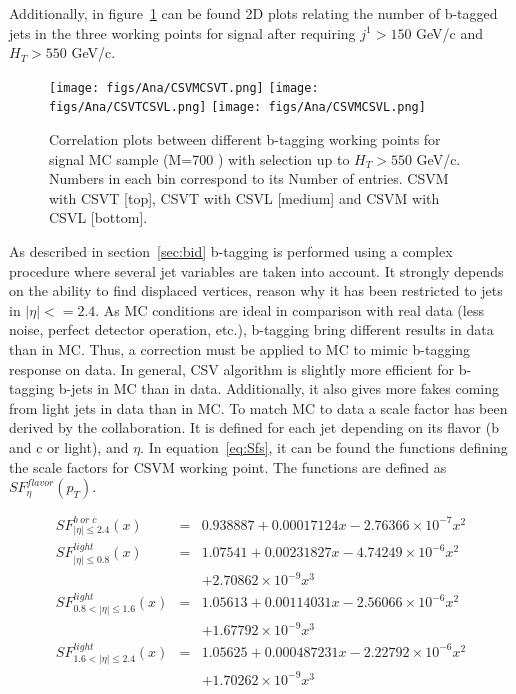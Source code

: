 Additionally, in figure~\ref{fig:WPcorr} can be found 2D plots relating the number of b-tagged jets in the three working points for signal after requiring $j^{1}>150$ GeV/c and $H_{T}>550$ GeV/c. 

\begin{figure}[!Hhtbp]
  \begin{center}
    \texttt{[image: figs/Ana/CSVMCSVT.png]}
    \texttt{[image: figs/Ana/CSVTCSVL.png]}
    \texttt{[image: figs/Ana/CSVMCSVL.png]}
    \caption{Correlation plots between different b-tagging working points for signal MC sample (M=700 \GeVcc) with selection up to $H_{T}>550$ GeV/c. Numbers in each bin correspond to its Number of entries. CSVM with CSVT [top], CSVT with CSVL [medium] and CSVM with CSVL [bottom].}
    \label{fig:WPcorr}
  \end{center}
\end{figure}

As described in section~\ref{sec:bid} b-tagging is performed using a complex procedure where several jet variables are taken into account. It strongly depends on the ability to find displaced vertices, reason why it has been restricted to jets in $|\eta|<=2.4$. As MC conditions are ideal in comparison with real data (less noise, perfect detector operation, etc.), b-tagging bring different results in data than in MC. Thus, a correction must be applied to MC to mimic b-tagging response on data. In general, CSV algorithm is slightly more efficient for b-tagging b-jets in MC than in data. Additionally, it also gives more fakes coming from light jets in data than in MC. To match MC to data a scale factor has been derived by the collaboration. It is defined for each jet depending on its flavor (b and c or light), \pt and $\eta$. In equation~\ref{eq:Sfs}, it can be found the functions defining the scale factors for CSVM working point. The functions are defined as $SF^{flavor}_{\eta}(p_{T})$.

\begin{eqnarray}
  \label{eq:Sfs}
  SF^{b\; or\; c}_{|\eta|\le 2.4}(x) & = & 0.938887 + 0.00017124x - 2.76366 \times 10^{-7}x^{2} \nonumber \\
  SF^{light}_{|\eta|\le 0.8}(x) & = & 1.07541 + 0.00231827x - 4.74249 \times 10^{-6}x^{2}  \nonumber \\
  &  & +2.70862 \times 10^{-9}x^{3} \nonumber \\
  SF^{light}_{0.8 < |\eta|\le 1.6}(x) & = & 1.05613 + 0.00114031x - 2.56066 \times 10^{-6}x^{2} \nonumber \\
  &  & + 1.67792 \times 10^{-9}x^{3} \nonumber \\
  SF^{light}_{1.6 < |\eta|\le 2.4}(x) & = & 1.05625 + 0.000487231x - 2.22792 \times 10^{-6}x^{2} \nonumber \\
  &  & + 1.70262 \times 10^{-9}x^{3}
\end{eqnarray}

